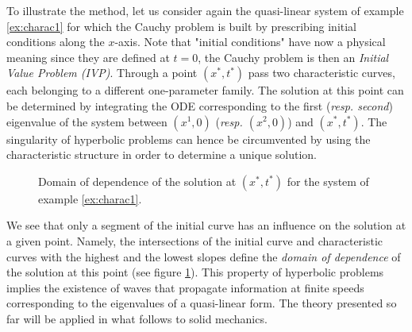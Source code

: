 To illustrate the method, let us consider again the quasi-linear system of example \ref{ex:charac1} for which the Cauchy problem is built by prescribing initial conditions along the $x$-axis. Note that "initial conditions" have now a physical meaning since they are defined at $t=0$, the Cauchy problem is then an \textit{Initial Value Problem (IVP)}. Through a point $(x^*,t^*)$ pass two characteristic curves, each belonging to a different one-parameter family. The solution at this point can be determined by integrating the ODE corresponding to the first (\textit{resp. second}) eigenvalue of the system between $(x^1,0)$ (\textit{resp. $(x^2,0)$}) and $(x^*,t^*)$. The singularity of hyperbolic problems can hence be circumvented by using the characteristic structure in order to determine a unique solution. 
\begin{figure}[h]
  \centering
  
  \caption{Domain of dependence of the solution at $(x^*,t^*)$ for the system of example \ref{ex:charac1}.}
  \label{fig:charac_method2x2}
\end{figure}
We see that only a segment of the initial curve has an influence on the solution at a given point. Namely, the intersections of the initial curve and characteristic curves with the highest and the lowest slopes define the \textit{domain of dependence} of the solution at this point (see figure \ref{fig:charac_method2x2}). This property of hyperbolic problems implies the existence of waves that propagate information at finite speeds corresponding to the eigenvalues of a quasi-linear form. The theory presented so far will be applied in what follows to solid mechanics.



